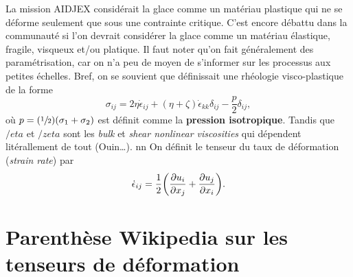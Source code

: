 \documentclass[10pt]{article}
\numberwithin{equation}{section}
\begin{document}
La mission AIDJEX considérait la glace comme un matériau plastique qui ne se déforme seulement que sous une contrainte critique.
C'est encore débattu dans la communauté si l'on devrait considérer la glace comme un matériau élastique, fragile, visqueux et/ou platique.
Il faut noter qu'on fait généralement des paramétrisation, car on n'a peu de moyen de s'informer sur les processus aux petites échelles.
Bref, on se souvient que \Textcite{hibler1979dynamic} définissait une rhéologie visco-plastique de la forme
\begin{equation}
   \sigma_{ij} = 2\eta \dot{\epsilon}_{ij} + (\eta + \zeta)\dot{\epsilon}_{kk} \delta_{ij} - \frac{p}{2}\delta_{ij},
\end{equation}
où \(p = (\sfrac{1}{2})(\sigma_1 + \sigma_2)\) est définit comme la \textbf{pression isotropique}.
Tandis que \(/eta\) et \(/zeta\) sont les \emph{bulk} et \emph{shear nonlinear viscosities} qui dépendent litérallement de tout (Ouin\ldots{}).
nn
On définit le tenseur du taux de déformation (\emph{strain rate}) par
\begin{equation}
\label{eq:org9db9907}
   \dot{\epsilon}_{ij} = \frac{1}{2}\qty(\pdv{u_i}{x_j} + \pdv{u_j}{x_i}). 
\end{equation}

\section{Parenthèse Wikipedia sur les tenseurs de déformation}
\label{sec:orgbe89798}
\end{document}
